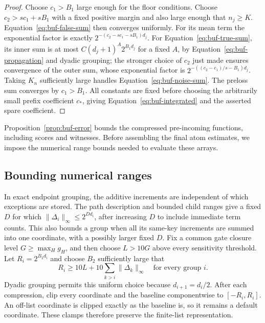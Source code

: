 \begin{proof}
Choose $c_1>B_1$ large enough for the floor conditions.  Choose
$c_2>sc_1+sB_1$ with a fixed positive margin and also large enough that
$n_j\geq K$.  Equation~\eqref{eq:buf-false-sum} then converges uniformly.
For its mean term the exponential factor is exactly
$2^{-(c_2-sc_1-sB_1)d_j}$.
For Equation~\eqref{eq:buf-true-sum}, its inner sum is at most
$C(d_j+1)^A2^{B_1d_j}$ for a fixed $A$, by
Equation~\eqref{eq:buf-propagation} and dyadic grouping; the stronger
choice of $c_2$ just made ensures convergence of the outer sum, whose
exponential factor is
$2^{-((c_2-c_1)/s-B_1)d_j}$.
Taking $K_n$ sufficiently large handles Equation~\eqref{eq:buf-noise-sum}.
The preloss sum converges by $c_1>B_1$.  All constants are fixed before
choosing the arbitrarily small prefix coefficient $c_*$, giving
Equation~\eqref{eq:buf-integrated} and the asserted spare coefficient.
\end{proof}

Proposition~\ref{prop:buf-error} bounds the compressed pre-incoming
functions, including scores and witnesses.  Before assembling the final
atom estimates, we impose the numerical range bounds needed to evaluate
these arrays.

\subsection{Bounding numerical ranges}

In exact endpoint grouping, the additive increments are independent of
which exceptions are stored.  The path description and bounded child
ranges give a fixed $D$ for which
$\|\Delta_i\|_\infty\leq2^{Dd_i}$, after increasing $D$ to include
immediate term counts.  This also bounds a group when all its same-key
increments are summed into one coordinate, with a possibly larger fixed
$D$.  Fix a common gate closure level $G\ge\max_H g_H$, and then
choose $L>10G$ above every sensitivity threshold.  Let
$R_i=2^{B_2d_i}$ and choose $B_2$ sufficiently large that
\begin{equation}
 R_i\geq 10L+10\sum_{k>i}\|\Delta_k\|_\infty
 \quad\text{for every group }i.
 \label{eq:buf-clamp-margin}
\end{equation}
Dyadic grouping permits this uniform choice because $d_{i+1}=d_i/2$.
After each compression, clip every coordinate and the baseline
componentwise to $[-R_i,R_i]$.
An off-list coordinate is clipped exactly as the baseline is, so it
remains a default coordinate.  These clamps therefore preserve the
finite-list representation.

